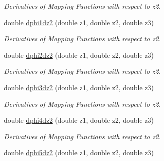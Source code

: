 \begin{DoxyCompactItemize}
\begin{DoxyCompactList}\small\item\em Derivatives of Mapping Functions with respect to z2. \item\end{DoxyCompactList}\item 
\hypertarget{classfemfunctions_a21176e2ca2bed178ffc248458123c1db}{
double \hyperlink{classfemfunctions_a21176e2ca2bed178ffc248458123c1db}{dphi1dz2} (double z1, double z2, double z3)}
\label{classfemfunctions_a21176e2ca2bed178ffc248458123c1db}

\begin{DoxyCompactList}\small\item\em Derivatives of Mapping Functions with respect to z2. \item\end{DoxyCompactList}\item 
\hypertarget{classfemfunctions_adf7cb387791bd1a52805e1cad5a6a78c}{
double \hyperlink{classfemfunctions_adf7cb387791bd1a52805e1cad5a6a78c}{dphi2dz2} (double z1, double z2, double z3)}
\label{classfemfunctions_adf7cb387791bd1a52805e1cad5a6a78c}

\begin{DoxyCompactList}\small\item\em Derivatives of Mapping Functions with respect to z2. \item\end{DoxyCompactList}\item 
\hypertarget{classfemfunctions_a6f224f2ad205a3d04067398c1a7d20f5}{
double \hyperlink{classfemfunctions_a6f224f2ad205a3d04067398c1a7d20f5}{dphi3dz2} (double z1, double z2, double z3)}
\label{classfemfunctions_a6f224f2ad205a3d04067398c1a7d20f5}

\begin{DoxyCompactList}\small\item\em Derivatives of Mapping Functions with respect to z2. \item\end{DoxyCompactList}\item 
\hypertarget{classfemfunctions_acdeeb9de9bd407108c8ae2d72d866782}{
double \hyperlink{classfemfunctions_acdeeb9de9bd407108c8ae2d72d866782}{dphi4dz2} (double z1, double z2, double z3)}
\label{classfemfunctions_acdeeb9de9bd407108c8ae2d72d866782}

\begin{DoxyCompactList}\small\item\em Derivatives of Mapping Functions with respect to z2. \item\end{DoxyCompactList}\item 
\hypertarget{classfemfunctions_ab834142881f1d85947ebda574356b9f5}{
double \hyperlink{classfemfunctions_ab834142881f1d85947ebda574356b9f5}{dphi5dz2} (double z1, double z2, double z3)}
\label{classfemfunctions_ab834142881f1d85947ebda574356b9f5}


\end{DoxyCompactItemize}
